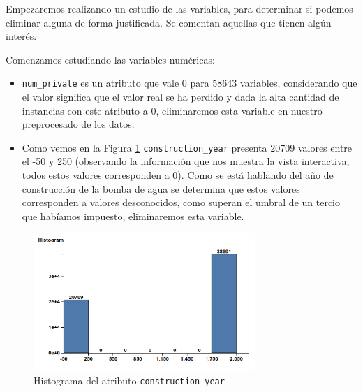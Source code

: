 \documentclass[a4paper, 20pt]{article}
\begin{document}
Empezaremos realizando un estudio de las variables, para determinar si podemos eliminar alguna de forma justificada. Se comentan aquellas que tienen algún interés.

Comenzamos estudiando las variables numéricas:
\begin{itemize}
\item \texttt{num\_private} es un atributo que vale 0 para 58643 variables, considerando que el valor significa que el valor real se ha perdido y dada la alta cantidad de instancias con este atributo a 0, eliminaremos esta variable en nuestro preprocesado de los datos.
\item Como vemos en la Figura \ref{fig:histCY} \texttt{construction\_year} presenta 20709 valores entre el -50 y 250 (observando la información que nos muestra la vista interactiva, todos estos valores corresponden a 0). Como se está hablando del año de construcción de la bomba de agua se determina que estos valores corresponden a valores desconocidos, como superan el umbral de un tercio que habíamos impuesto, eliminaremos esta variable.
\end{itemize}

\begin{figure}[H]
    \centering
    \includegraphics[width=0.75\textwidth]{histogramaCY}
    \caption{Histograma del atributo \texttt{construction\_year}}
    \label{fig:histCY}
\end{figure}
\end{document}
